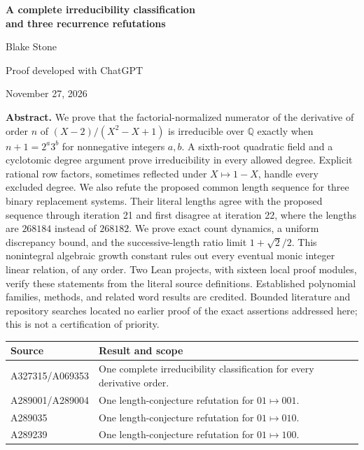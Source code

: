 \documentclass[11pt]{article}
\newcommand{\Q}{\mathbb Q}
\begin{document}
\begin{center}
{\LARGE\bfseries A complete irreducibility classification\\[3pt]
and three recurrence refutations}\par
\vspace{0.5em}
{\large Blake Stone}\par
Proof developed with ChatGPT\par
November 27, 2026
\end{center}

\textbf{Abstract.}
We prove that the factorial-normalized numerator of the derivative of
order $n$ of $(X-2)/(X^2-X+1)$ is irreducible over $\Q$ exactly when
$n+1=2^a3^b$ for nonnegative integers $a,b$.  A sixth-root quadratic
field and a cyclotomic degree argument prove irreducibility in every
allowed degree.  Explicit rational row factors, sometimes reflected
under $X\mapsto1-X$, handle every excluded degree.
We also refute the proposed common length sequence for three binary
replacement systems.  Their literal lengths agree with the proposed
sequence through iteration 21 and first disagree at iteration 22,
where the lengths are $268184$ instead of $268182$.  We prove exact
count dynamics, a uniform discrepancy bound, and the successive-length
ratio limit $1+\sqrt2/2$.  This nonintegral algebraic growth constant
rules out every eventual monic integer linear relation, of any order.
Two Lean projects, with sixteen local proof modules, verify these
statements from the literal source definitions.  Established polynomial
families, methods, and related word results are credited.  Bounded
literature and repository searches located no earlier proof of the
exact assertions addressed here; this is not a certification of priority.

\begin{center}
\begin{tabular}{@{}l>{\raggedright\arraybackslash}p{4.5in}@{}}
\toprule
Source & Result and scope\\
\midrule
A327315/A069353 & One complete irreducibility classification for every derivative order.\\
A289001/A289004 & One length-conjecture refutation for $01\mapsto001$.\\
A289035 & One length-conjecture refutation for $01\mapsto010$.\\
A289239 & One length-conjecture refutation for $01\mapsto100$.\\
\bottomrule
\end{tabular}
\end{center}
\end{document}
